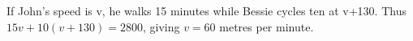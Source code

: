 If John's speed is v, he walks 15 minutes while Bessie cycles ten at v+130. Thus $15v+10(v+130)=2800$, giving $\boxed{v=60}$ metres per minute.
